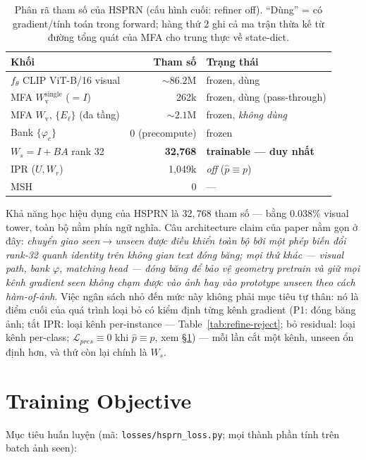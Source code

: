 \documentclass[10pt,twocolumn,letterpaper]{article}
\newcommand{\phat}{\hat{p}}
\begin{document}
\begin{table}[t]
\centering
\caption{Phân rã tham số của HSPRN (cấu hình cuối: refiner off). ``Dùng'' = có gradient/tính toán trong forward; hàng thứ 2 ghi cả ma trận thừa kế từ đường tổng quát của MFA cho trung thực về state-dict.}
\label{tab:params}
\small
\begin{tabular}{lrl}
\toprule
Khối & Tham số & Trạng thái \\
\midrule
$f_\theta$ CLIP ViT-B/16 visual & ${\sim}86.2$M & frozen, dùng \\
MFA $W_{\mathrm v}^{\text{single}}$ ($=I$) & 262k & frozen, dùng (pass-through) \\
MFA $W_{\mathrm v}$, $\{E_\ell\}$ (đa tầng) & ${\sim}2.1$M & frozen, \emph{không dùng} \\
Bank $\{\varphi_c\}$ & $0$ (precompute) & frozen \\
$W_s = I + BA$ rank 32 & \textbf{32{,}768} & \textbf{trainable — duy nhất} \\
IPR ($U, W_r$) & 1{,}049k & \emph{off} ($\phat\equiv p$) \\
MSH & $0$ & --- \\
\bottomrule
\end{tabular}
\end{table}

Khả năng học hiệu dụng của HSPRN là $32{,}768$ tham số — bằng $0.038\%$ visual tower, toàn bộ nằm phía ngữ nghĩa. Câu architecture claim của paper nằm gọn ở đây: \emph{chuyển giao seen$\to$unseen được điều khiển toàn bộ bởi một phép biến đổi rank-32 quanh identity trên không gian text đóng băng; mọi thứ khác — visual path, bank $\varphi$, matching head — đóng băng để bảo vệ geometry pretrain và giữ mọi kênh gradient seen không chạm được vào ảnh hay vào prototype unseen theo cách hàm-of-ảnh}. Việc ngân sách nhỏ đến mức này không phải mục tiêu tự thân: nó là điểm cuối của quá trình loại bỏ có kiểm định từng kênh gradient (P1: đóng băng ảnh; tắt IPR: loại kênh per-instance — Table~\ref{tab:refine-reject}; bỏ residual: loại kênh per-class; $\mathcal L_{pres} \equiv 0$ khi $\phat \equiv p$, xem §\ref{sec:loss}) — mỗi lần cắt một kênh, unseen ổn định hơn, và thứ còn lại chính là $W_s$.

\section{Training Objective}
\label{sec:loss}

Mục tiêu huấn luyện (mã: \texttt{losses/hsprn\_loss.py}; mọi thành phần tính trên batch ảnh seen):
\end{document}
